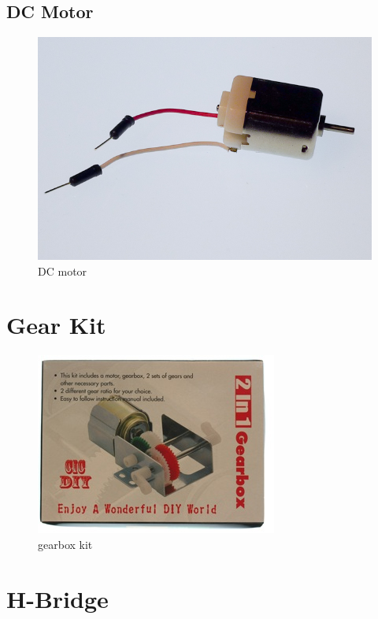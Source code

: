 \subsection{DC Motor}

\begin{figure}[!htb]
     \centering
     \includegraphics[scale=0.3]{img/components/dc_motor.jpg}
     \caption{DC motor}
     \label{DC motor}
\end{figure}


\section{Gear Kit}

\begin{figure}[!htb]
     \centering
     \includegraphics[scale=0.5]{img/components/gear_kit.jpg}
     \caption{gearbox kit}
     \label{LEDs}
\end{figure}


\section{H-Bridge}

